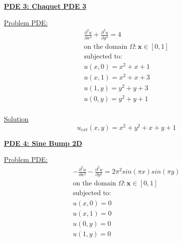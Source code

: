 \documentclass[.\jobname.tex]{subfiles}
\begin{document}
\newpage



\underline{\textbf{PDE 3: Chaquet PDE 3}}

\underline{Problem PDE:} 
\begin{equation}
\label{eq:pde3}
\begin{split}
\frac{\partial^2 u}{\partial x^2} + \frac{\partial^2 u}{\partial y^2} = 4 \\
\text{on the domain } \Omega: \mathbf{x} \in [0,1] \\
\text{subjected to: } \\
u(x,0) = x^2 + x + 1 \\
u(x,1) = x^2 + x + 3 \\
u(1,y) = y^2 + y + 3 \\
u(0,y) = y^2 + y + 1 \\
\end{split}
\end{equation}


\underline{Solution}
\begin{equation}
\label{eq:sol3}
u_{ext}(x,y) = x^2 + y^2 + x + y + 1
\end{equation}


\begin{figure}[H]
	\centering
	\noindent{}
	\label{fig:sol_plot_3}
\end{figure}



\newpage




\underline{\textbf{PDE 4: Sine Bump 2D}} 

\underline{Problem PDE:}
\begin{equation}
\label{eq:pde4}
\begin{split}
-\frac{\partial^2 u}{\partial x^2} - \frac{\partial^2 u}{\partial y^2} = 2\pi^2 sin(\pi x) sin(\pi y) \\
\text{on the domain } \Omega: \mathbf{x} \in [0,1] \\
\text{subjected to: } \\
u(x,0) = 0 \\
u(x,1) = 0 \\
u(0,y) = 0 \\
u(1,y) = 0 \\
\end{split}
\end{equation}
\end{document}
